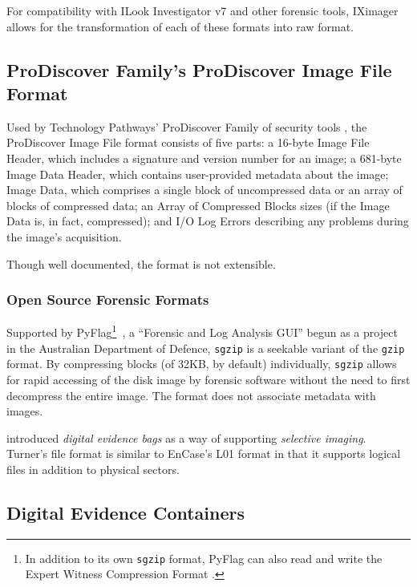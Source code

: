 \documentclass[11pt,letter]{article}
\newcommand{\citeN}[1]{\cite{#1}}
\begin{document}
For compatibility with ILook Investigator v7 and other forensic
tools, IXimager allows for the transformation of each of these
formats into raw format.

\subsection{ProDiscover Family's ProDiscover Image File Format}
Used by Technology Pathways' ProDiscover Family of security tools
\cite{prodiscover}, the ProDiscover Image File format
\cite{prodiscoverformat} consists of five parts: a 16-byte Image
File Header, which includes a signature and version number for an
image; a 681-byte Image Data Header, which contains user-provided
metadata about the image; Image Data, which comprises a single block
of uncompressed data or an array of blocks of compressed data; an
Array of Compressed Blocks sizes (if the Image Data is, in fact,
compressed); and I/O Log Errors describing any problems during the
image's acquisition.

Though well documented, the format is not extensible.


\subsubsection{Open Source Forensic Formats}

Supported by PyFlag\footnote{In addition to its own {\tt sgzip} format,
PyFlag can also read and write the Expert Witness Compression Format
\cite{pyflagiosources}.}~\cite{pyflag}, a ``Forensic and Log
Analysis GUI'' begun as a project in the Australian Department of
Defence, {\tt sgzip} is a seekable variant of the {\tt gzip} format.  By
compressing blocks (of 32KB, by default) individually, {\tt sgzip} allows
for rapid accessing of the disk image by forensic software without the
need to first decompress the entire image. The format does not associate metadata with images.
\cite{pyflagdiskforensics,pyflagiosources}



\citeN{dfrws2005:PhilipTurner} introduced \emph{digital evidence bags}
as a way of supporting \emph{selective imaging}. Turner's file format
is similar to EnCase's L01 format in that it supports logical files in
addition to physical sectors.



\subsection{Digital Evidence Containers}
\end{document}
